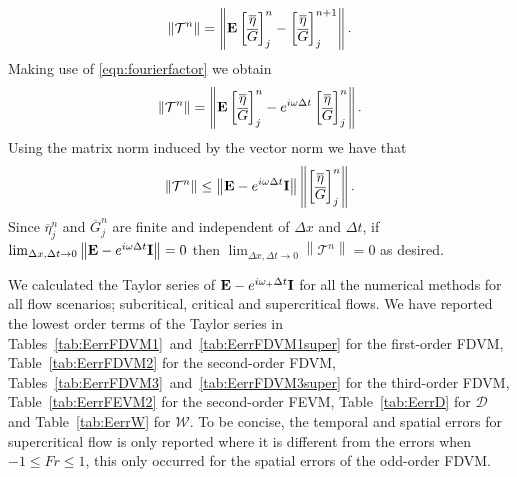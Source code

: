 \begin{equation*}
\left \|\mathcal{T}^n \right \| = \left \|  \mathbf{E}\begin{bmatrix}
\overline{\eta} \\ \overline{G}
\end{bmatrix}^{n}_j - \begin{bmatrix}
\overline{\eta} \\ \overline{G}
\end{bmatrix}^{n+1}_j \right \|.
\label{eqn:consistencyTnnorm1}
\end{equation*}
Making use of \eqref{eqn:fourierfactor} we obtain
\begin{equation*}
\left \|\mathcal{T}^n \right \| = \left \|  \mathbf{E}\begin{bmatrix}
\overline{\eta} \\ \overline{G}
\end{bmatrix}^{n}_j -  e^{i \omega \Delta t} \begin{bmatrix}
\overline{\eta} \\ \overline{G}
\end{bmatrix}^{n}_j \right \|.
\end{equation*}
Using the matrix norm induced by the vector norm we have that
\begin{equation}
\left \|\mathcal{T}^n \right \|  \le \left \| \mathbf{E} -  e^{i \omega \Delta t}\mathbf{I} \right \| \left \| \begin{bmatrix}
\overline{\eta} \\ \overline{G}
\end{bmatrix}^{n}_j\right \|.
\end{equation}
Since $\overline{\eta}^n_j$ and  $\overline{G}^n_j$ are finite and independent of $\Delta x$ and $\Delta t$, if $ \lim_{\Delta x,\Delta t \rightarrow 0}\left \| \mathbf{E} -  e^{i \omega \Delta t}\mathbf{I} \right \| = 0 $ then $ \lim_{\Delta x,\Delta t \rightarrow 0}\left \| \mathcal{T}^n \right \| = 0 $ as desired.

We calculated the Taylor series of $\mathbf{E} -  e^{i \omega_+ \Delta t}\mathbf{I}$ for all the numerical methods for all flow scenarios; subcritical, critical and supercritical flows. We have reported the lowest order terms of the Taylor series in Tables~\ref{tab:EerrFDVM1}~and~\ref{tab:EerrFDVM1super} for the first-order FDVM, Table~\ref{tab:EerrFDVM2} for the second-order FDVM, Tables~\ref{tab:EerrFDVM3}~and~\ref{tab:EerrFDVM3super} for the third-order FDVM,  Table~\ref{tab:EerrFEVM2} for the second-order FEVM, Table~\ref{tab:EerrD} for $\mathcal{D}$ and Table~\ref{tab:EerrW} for $\mathcal{W}$. To be concise, the temporal and spatial errors for supercritical flow is only reported where it is different from the errors when $-1 \le Fr \le 1$, this only occurred for the spatial errors of the odd-order FDVM. 

